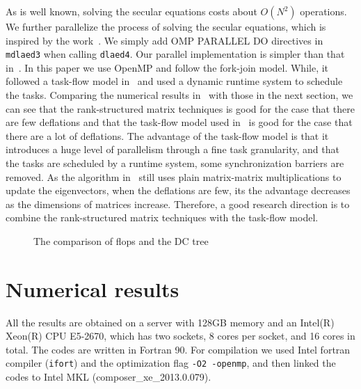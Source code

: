 \documentclass[times]{nlaauth}
\newcounter{algorithm}
\begin{document}
As is well known, solving the secular equations costs about $O(N^2)$ operations.
We further parallelize the process of solving the secular equations, which is
inspired by the work~\cite{DC_quark}.
We simply add OMP PARALLEL DO directives in \texttt{mdlaed3} when calling \texttt{dlaed4}.
Our parallel implementation is simpler than that in~\cite{DC_quark}.
In this paper we use OpenMP and follow the fork-join model.
While, it followed a task-flow model in~\cite{DC_quark} and used a dynamic runtime system to schedule the tasks.
Comparing the numerical results in~\cite{DC_quark} with those in the next section, we can see that the
rank-structured matrix techniques is good for the case that there are few deflations and that
the task-flow model used in~\cite{DC_quark} is good for the case that there are a lot of
deflations.
The advantage of the task-flow model is that it introduces a huge level of parallelism
through a fine task granularity, and that the tasks are scheduled by a runtime system, some synchronization barriers are removed.
As the algorithm in~\cite{DC_quark} still uses plain matrix-matrix multiplications to update the eigenvectors,
when the deflations are few, its the advantage decreases as
the dimensions of matrices increase.
Therefore, a good research direction is to combine the rank-structured matrix techniques with the task-flow model.


\begin{figure}[ptbh]
\centering
{}
\caption{The comparison of flops and the DC tree}\label{fig:flops_res}
\end{figure}


\section{Numerical results}
\label{sec:numer-tedc}

All the results are obtained on a server with 128GB memory and an Intel(R) Xeon(R) CPU E5-2670, which has
two sockets, 8 cores per socket, and 16 cores in total.
The codes are written in Fortran 90.
For compilation we used Intel fortran compiler (\texttt{ifort}) and the optimization flag
\texttt{-O2 -openmp}, and then linked the codes to Intel MKL (composer\_xe\_2013.0.079).
\end{document}
